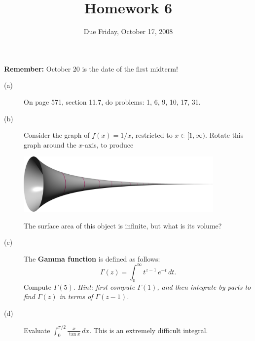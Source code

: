 \documentclass[12pt]{article}
\title{Homework 6}
\date{Due Friday, October 17, 2008}
\begin{document}
\maketitle

\textbf{Remember:} October 20 is the date of the first midterm!

\begin{description}

\item[(a)] On page 571, section 11.7, do problems: 1, 6, 9, 10, 17, 31.

\vfill

\item[(b)] Consider the graph of $f(x) = 1/x$, restricted to $x \in
  [1,\infty)$.  Rotate this graph around the $x$-axis, to produce
\begin{center}
\includegraphics[width=4in]{GabrielHorn.pdf}
\end{center}
The surface area of this object is infinite, but what is its volume?

\vfill

\item[(c)] The \textbf{Gamma function} is defined as follows:
$$
\Gamma(z) = \int_0^\infty t^{z-1} \, e^{-t} \, dt.
$$
Compute $\Gamma(5)$.  \textit{Hint: first compute $\Gamma(1)$, and then integrate by parts to find $\Gamma(z)$ in terms of $\Gamma(z-1)$.}

\vfill

\item[(d)] Evaluate $\displaystyle\int_0^{\pi/2} \displaystyle\frac{x}{\tan x} \, dx$.
This is an extremely difficult integral.

\vfill


%

\end{description}

\pagebreak
\null
\end{document}
